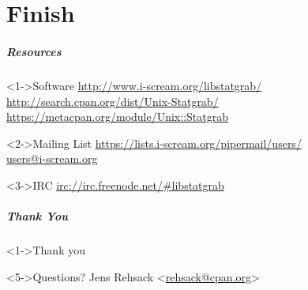 \documentclass[ngerman,xcolor={table,dvipsnames},scriptsizeer,compress,hyperref={bookmarks,colorlinks}]{beamer}
\begin{document}



\part{Finish}

\begin{frame}[fragile]
\frametitle{Resources}
\begin{block}<1->{Software}
\url{http://www.i-scream.org/libstatgrab/} \\
\url{http://search.cpan.org/dist/Unix-Statgrab/} \\
\url{https://metacpan.org/module/Unix::Statgrab}
\end{block}

\begin{block}<2->{Mailing List}
\url{https://lists.i-scream.org/pipermail/users/} \\
\url{users@i-scream.org}
\end{block}

\begin{block}<3->{IRC}
\url{irc://irc.freenode.net/#libstatgrab}
\end{block}
\end{frame}

\begin{frame}[fragile]
\frametitle{Thank You}
\begin{block}<1->{Thank you}
\begin{itemize}
\end{itemize}
\end{block}
\begin{block}<5->{Questions?}
Jens Rehsack \textless{}\href{mailto:rehsack@cpan.org}{rehsack@cpan.org}\textgreater{}
\end{block}
\end{frame}

\end{document}
